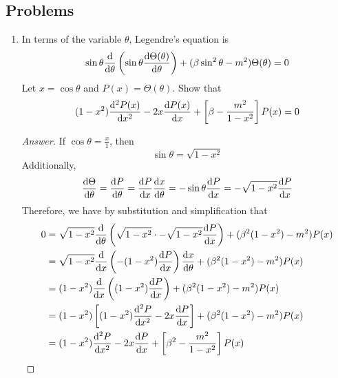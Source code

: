 \documentclass[../notes.tex]{subfiles}
\begin{document}
\subsection*{Problems}
\begin{enumerate}[label={\textbf{6-\arabic*.}},ref={6-\arabic*}]
    \item \label{prb:6-2}In terms of the variable $\theta$, Legendre's equation is
    \begin{equation*}
        \sin\theta\dv{\theta}\left( \sin\theta\dv{\Theta(\theta)}{\theta} \right)+(\beta\sin^2\theta-m^2)\Theta(\theta) = 0
    \end{equation*}
    Let $x=\cos\theta$ and $P(x)=\Theta(\theta)$. Show that
    \begin{equation*}
        (1-x^2)\dv[2]{P(x)}{x}-2x\dv{P(x)}{x}+\left[ \beta-\frac{m^2}{1-x^2} \right]P(x) = 0
    \end{equation*}
    \begin{proof}[Answer]
        If $\cos\theta=\frac{x}{1}$, then
        \begin{equation*}
            \sin\theta = \sqrt{1-x^2}
        \end{equation*}
        Additionally,
        \begin{equation*}
            \dv{\Theta}{\theta} = \dv{P}{\theta}
            = \dv{P}{x}\dv{x}{\theta}
            = -\sin\theta\dv{P}{x}
            = -\sqrt{1-x^2}\dv{P}{x}
        \end{equation*}
        Therefore, we have by substitution and simplification that
        \begin{align*}
            0 &= \sqrt{1-x^2}\dv{\theta}\left( \sqrt{1-x^2}\cdot -\sqrt{1-x^2}\dv{P}{x} \right)+(\beta^2(1-x^2)-m^2)P(x)\\
            &= \sqrt{1-x^2}\dv{x}\left( -(1-x^2)\dv{P}{x} \right)\dv{x}{\theta}+(\beta^2(1-x^2)-m^2)P(x)\\
            &= (1-x^2)\dv{x}\left( (1-x^2)\dv{P}{x} \right)+(\beta^2(1-x^2)-m^2)P(x)\\
            &= (1-x^2)\left[ (1-x^2)\dv[2]{P}{x}-2x\dv{P}{x} \right]+(\beta^2(1-x^2)-m^2)P(x)\\
            &= (1-x^2)\dv[2]{P}{x}-2x\dv{P}{x}+\left[ \beta^2-\frac{m^2}{1-x^2} \right]P(x)
        \end{align*}
    \end{proof}
\end{enumerate}
\end{document}
